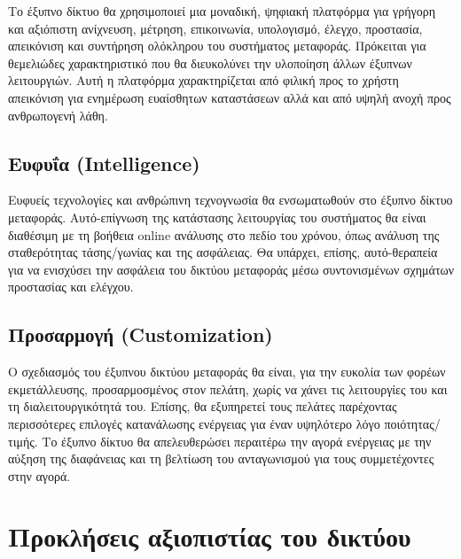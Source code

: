 \documentclass[12pt, a4paper, oneside]{report}
\begin{document}
Το έξυπνο δίκτυο θα χρησιμοποιεί μια μοναδική, ψηφιακή πλατφόρμα για γρήγορη και αξιόπιστη ανίχνευση, μέτρηση, επικοινωνία, υπολογισμό, έλεγχο, προστασία, απεικόνιση και συντήρηση ολόκληρου του συστήματος μεταφοράς. Πρόκειται για θεμελιώδες χαρακτηριστικό που θα διευκολύνει την υλοποίηση άλλων έξυπνων λειτουργιών. Αυτή η πλατφόρμα χαρακτηρίζεται από φιλική προς το χρήστη απεικόνιση για ενημέρωση ευαίσθητων καταστάσεων αλλά και από υψηλή ανοχή προς ανθρωπογενή λάθη.

\subsection*{Ευφυΐα (Intelligence)}

Ευφυείς τεχνολογίες και ανθρώπινη τεχνογνωσία θα ενσωματωθούν στο έξυπνο δίκτυο μεταφοράς. Αυτό-επίγνωση της κατάστασης λειτουργίας του συστήματος θα είναι διαθέσιμη με τη βοήθεια online ανάλυσης στο πεδίο του χρόνου, όπως ανάλυση της σταθερότητας τάσης\slash γωνίας και της ασφάλειας. Θα υπάρχει, επίσης, αυτό-θεραπεία για να ενισχύσει την ασφάλεια του δικτύου μεταφοράς μέσω συντονισμένων σχημάτων προστασίας και ελέγχου.

\subsection*{Προσαρμογή (Customization)}

Ο σχεδιασμός του έξυπνου δικτύου μεταφοράς θα είναι, για την ευκολία των φορέων εκμετάλλευσης, προσαρμοσμένος στον πελάτη, χωρίς να χάνει τις λειτουργίες του και τη διαλειτουργικότητά του. Επίσης, θα εξυπηρετεί τους πελάτες παρέχοντας περισσότερες επιλογές κατανάλωσης ενέργειας για έναν υψηλότερο λόγο ποιότητας\slash τιμής. Το έξυπνο δίκτυο θα απελευθερώσει περαιτέρω την αγορά ενέργειας με την αύξηση της διαφάνειας και τη βελτίωση του ανταγωνισμού για τους συμμετέχοντες στην αγορά.

\section{Προκλήσεις αξιοπιστίας του δικτύου}
\end{document}
